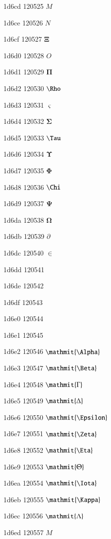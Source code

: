 \documentclass[11pt]{article}
\begin{document}
1d6cd 120525 \ensuremath{M}

1d6ce 120526 \ensuremath{N}

1d6cf 120527 \ensuremath{\mathbf{\Xi}}

1d6d0 120528 \ensuremath{O}

1d6d1 120529 \ensuremath{\mathbf{\Pi}}

1d6d2 120530 \ensuremath{\mathbf{\Rho}}

1d6d3 120531 \ensuremath{\mathbf{\varsigma}}

1d6d4 120532 \ensuremath{\mathbf{\Sigma}}

1d6d5 120533 \ensuremath{\mathbf{\Tau}}

1d6d6 120534 \ensuremath{\mathbf{\Upsilon}}

1d6d7 120535 \ensuremath{\mathbf{\Phi}}

1d6d8 120536 \ensuremath{\mathbf{\Chi}}

1d6d9 120537 \ensuremath{\mathbf{\Psi}}

1d6da 120538 \ensuremath{\mathbf{\Omega}}

1d6db 120539 \ensuremath{\partial}

1d6dc 120540 \ensuremath{\in}

1d6dd 120541 \mathbf{\vartheta}

1d6de 120542 \mathbf{\varkappa}

1d6df 120543 \mathbf{\phi}

1d6e0 120544 \mathbf{\varrho}

1d6e1 120545 \mathbf{\varpi}

1d6e2 120546 \ensuremath{\mathmit{\Alpha}}

1d6e3 120547 \ensuremath{\mathmit{\Beta}}

1d6e4 120548 \ensuremath{\mathmit{\Gamma}}

1d6e5 120549 \ensuremath{\mathmit{\Delta}}

1d6e6 120550 \ensuremath{\mathmit{\Epsilon}}

1d6e7 120551 \ensuremath{\mathmit{\Zeta}}

1d6e8 120552 \ensuremath{\mathmit{\Eta}}

1d6e9 120553 \ensuremath{\mathmit{\Theta}}

1d6ea 120554 \ensuremath{\mathmit{\Iota}}

1d6eb 120555 \ensuremath{\mathmit{\Kappa}}

1d6ec 120556 \ensuremath{\mathmit{\Lambda}}

1d6ed 120557 \ensuremath{M}
\end{document}
